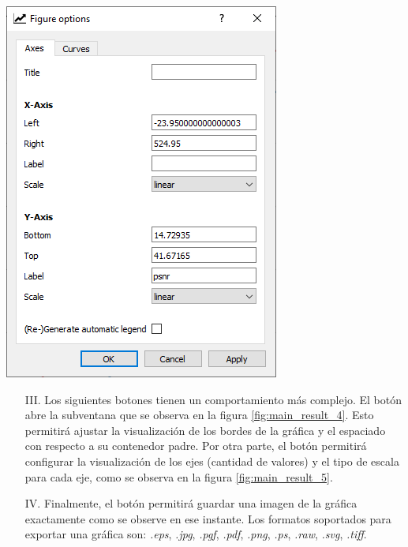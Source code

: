 \documentclass[12pt,twoside,letter]{ol-softwaremanual}
\newenvironment{Figure}
  {\par\medskip\noindent\minipage{\linewidth}}
  {\endminipage\par\medskip}
\begin{document}
\begin{multicols}{2}

\begin{Figure}
	\centering
	\includegraphics[width=0.7\linewidth]{main-result-5.png}
	\label{fig:main_result_5}
\end{Figure}

\vfill\null
\columnbreak

\begin{itemize}
	\setlength\itemsep{0em}
	
	 \item[III.] Los siguientes botones tienen un comportamiento más complejo. El botón \hspace{0.5mm} \faBars \hspace{0.5mm} abre la subventana que se observa en la figura \ref{fig:main_result_4}. Esto permitirá ajustar la visualización de los bordes de la gráfica y el espaciado con respecto a su contenedor padre. Por otra parte, el botón \hspace{0.5mm} \faLineChart \hspace{0.5mm} permitirá configurar la visualización de los ejes (cantidad de valores) y el tipo de escala para cada eje, como se observa en la figura \ref{fig:main_result_5}.
	
	\item[IV.] Finalmente, el botón \hspace{0.5mm} \faSave \hspace{0.5mm} permitirá guardar una imagen de la gráfica exactamente como se observe en ese instante. Los formatos soportados para exportar una gráfica son: \textit{.eps}, \textit{.jpg}, \textit{.pgf}, \textit{.pdf}, \textit{.png}, \textit{.ps}, \textit{.raw}, \textit{.svg}, \textit{.tiff}.
\end{itemize}

\end{multicols}
\end{document}

